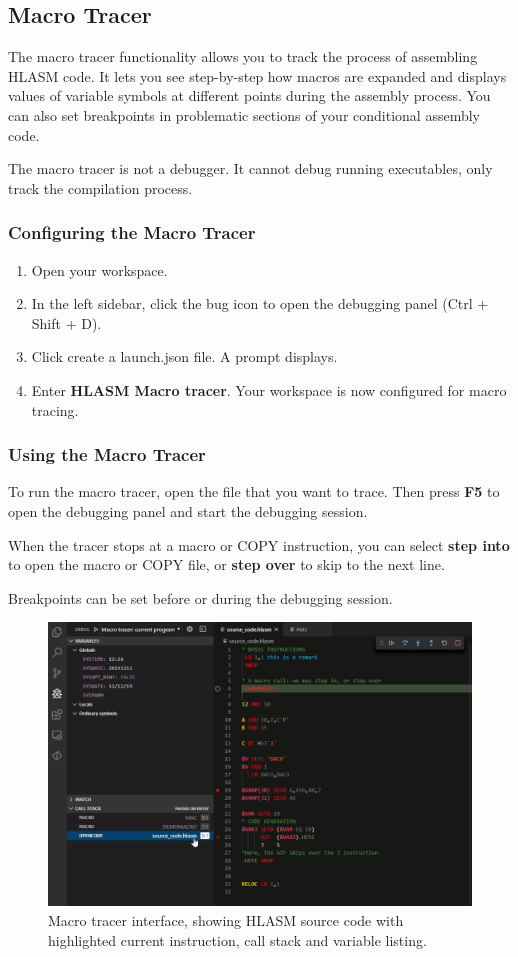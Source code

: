 \subsection{Macro Tracer}
The macro tracer functionality allows you to track the process of assembling HLASM code. It lets you see step-by-step how macros are expanded and displays values of variable symbols at different points during the assembly process. You can also set breakpoints in problematic sections of your conditional assembly code. 

The macro tracer is not a debugger. It cannot debug running executables, only track the compilation process.

\subsubsection{Configuring the Macro Tracer}

\begin{enumerate}
	\item Open your workspace.
	\item In the left sidebar, click the bug icon to open the debugging panel (Ctrl + Shift + D).
	\item Click create a launch.json file. A  prompt displays.
	\item Enter \textbf{HLASM Macro tracer}. Your workspace is now configured for macro tracing.
\end{enumerate}

\subsubsection{Using the Macro Tracer}

To run the macro tracer, open the file that you want to trace. Then press \textbf{F5} to open the debugging panel and start the debugging session.

When the tracer stops at a macro or COPY instruction, you can select \textbf{step into} to open the macro or COPY file, or \textbf{step over} to skip to the next line.

Breakpoints can be set before or during the debugging session.

\begin{figure}[H]
	\centering
	\includegraphics[width=\linewidth]{img/tracer/tracer-175}
	\caption{Macro tracer interface, showing HLASM source code with highlighted current instruction, call stack and variable listing.}
\end{figure}
